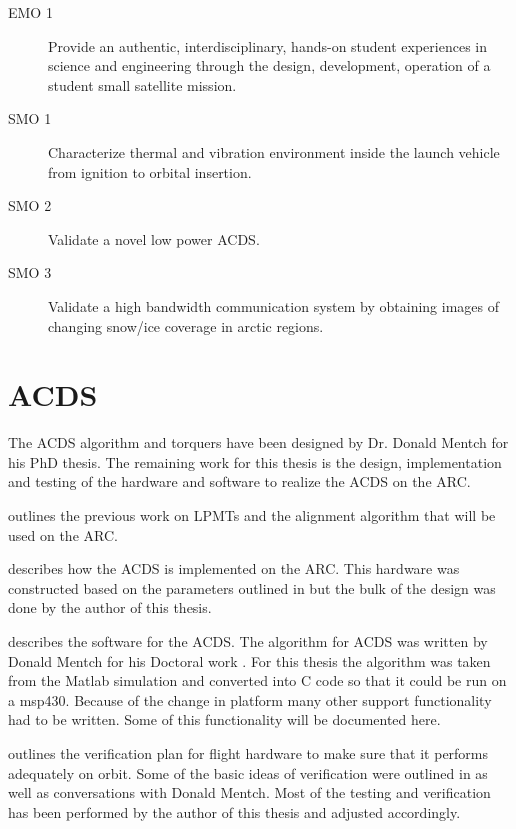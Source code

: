 \begin{description}

    \item[\acl{EMO} 1] Provide an authentic, interdisciplinary, hands-on student experiences in science and engineering through the design, development, operation of a student small satellite mission.

    \item[\acl{SMO} 1] Characterize thermal and vibration environment inside the launch vehicle from ignition to orbital insertion.

    \item[\acl{SMO} 2] Validate a novel low power \ac{ACDS}.

    \item[\acl{SMO} 3] Validate a high bandwidth communication system by obtaining images of changing snow/ice coverage in arctic regions.
\end{description}

\section{\acl{ACDS}}

The \ac{ACDS} algorithm and torquers have been designed by Dr. Donald Mentch for his PhD thesis. The remaining work for this thesis is the design, implementation and testing of the hardware and software to realize the \ac{ACDS} on the \ac{ARC}.

 outlines the previous work on \acp{LPMT} and the alignment algorithm that will be used on the \ac{ARC}.

 describes how the \ac{ACDS} is implemented on the \ac{ARC}. This hardware was constructed based on the parameters outlined in \cite{Mentch11} but the bulk of the design was done by the author of this thesis.

 describes the software for the \ac{ACDS}. The algorithm for \ac{ACDS} was written by Donald Mentch for his Doctoral work \cite{Mentch11}. For this thesis the algorithm was taken from the Matlab simulation and converted into C code so that it could be run on a msp430. Because of the change in platform many other support functionality had to be written. Some of this functionality will be documented here.

 outlines the verification plan for flight hardware to make sure that it performs adequately on orbit. Some of the basic ideas of verification were outlined in \cite{Mentch11} as well as conversations with Donald Mentch. Most of the testing and verification has been performed by the author of this thesis and adjusted accordingly.

